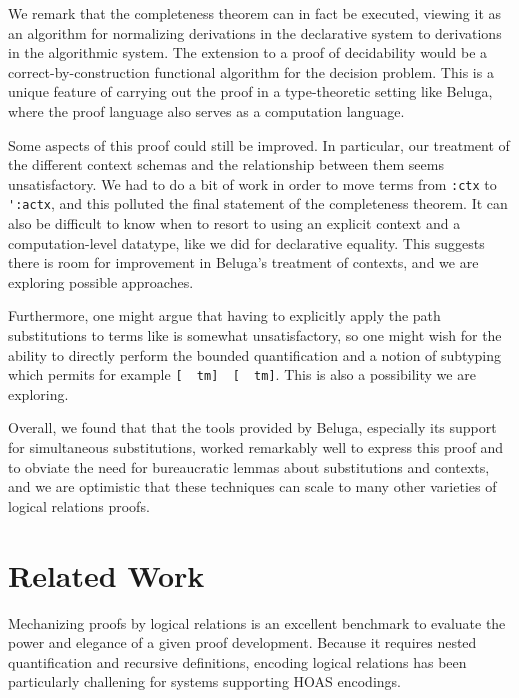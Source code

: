 \documentclass[copyright,creativecommons]{eptcs}
\begin{document}
We remark that the completeness theorem can in
fact be executed, viewing it as an algorithm for normalizing
derivations in the declarative system
to derivations in the algorithmic system. The extension to a proof of
decidability would be a correct-by-construction functional algorithm
for the decision problem. This is a unique feature of
carrying out the proof in a type-theoretic setting like Beluga, where the proof language also serves
as a computation language.

Some aspects of this proof could still be improved. In
particular, our treatment of the different context schemas and the
relationship between them seems unsatisfactory. We had to do a bit of
work in order to move terms from \lstinline{:ctx} to
\lstinline{':actx}, and this polluted the final statement of
the completeness theorem. It can also be difficult to
know when to resort to using an explicit context and a
computation-level datatype, like we did for
declarative equality. This suggests there is room for improvement in
Beluga's treatment of contexts, and we are exploring possible approaches.

Furthermore, one might argue that having to explicitly apply the path
substitutions  to terms like  is somewhat unsatisfactory,
so one might wish for the ability to directly perform the bounded
quantification  and a notion of subtyping which permits
for example \lstinline{[  tm]  [  tm]}. This is also a possibility we are exploring.

Overall, we found that that the tools provided by Beluga,
especially its support for simultaneous substitutions, worked
remarkably well to express this proof and to obviate the need for
bureaucratic lemmas about substitutions and contexts, and we are
optimistic that these techniques can scale to many other varieties of logical
relations proofs.

\section{Related Work}
Mechanizing proofs by logical relations is an excellent benchmark to evaluate
the power and elegance of a given proof development. Because it requires nested
quantification and recursive definitions, encoding logical relations has been
particularly challening for systems supporting HOAS encodings.
\end{document}
